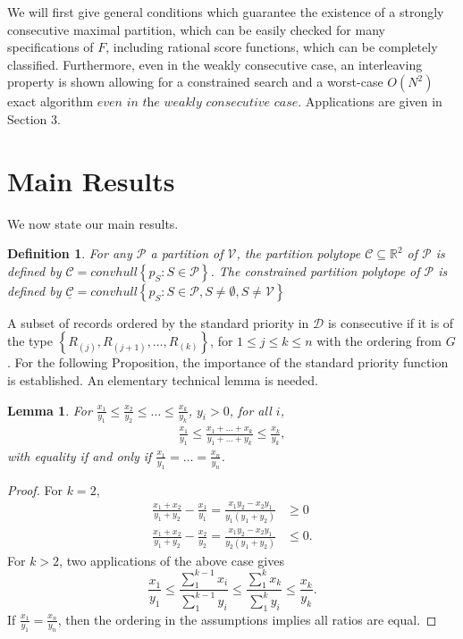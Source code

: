 \documentclass{article}
\newtheorem{definition}{Definition}
\newtheorem{lemma}{Lemma}
\theoremstyle{case}
\begin{document}
\vspace{4pt}

We will first give general conditions which guarantee the existence of a strongly consecutive maximal partition, which can be easily checked for many specifications of $F$, including rational score functions, which can be completely classified. Furthermore, even in the weakly consecutive case, an interleaving property is shown allowing for a constrained search and a worst-case $O(N^2)$ exact algorithm $\textit{even in the weakly consecutive case}$. Applications are given in Section 3.

\section{Main Results}
We now state our main results. 

\begin{definition}
For any $\mathcal{P}$ a partition of $\mathcal{V}$, the partition polytope $\mathcal{C} \subseteq \mathbb{R}^2$ of $\mathcal{P}$ is defined by $\mathcal{C} = convhull \left\lbrace p_S : S \in \mathcal{P}\right\rbrace$. The constrained partition polytope of $\mathcal{P}$ is defined by $\underline{\mathcal{C}} = convhull \left\lbrace p_S : S \in \mathcal{P}, S \neq \emptyset , S \neq \mathcal{V}\right\rbrace$
\end{definition}

A subset of records ordered by the standard priority in $\mathcal{D}$ is consecutive if it is of the type $\left\lbrace R_{(j)}, R_{(j+1)}, \dots, R_{(k)}\right\rbrace$, for $1 \leq j \leq k \leq n$ with the ordering from $G$. For the following Proposition, the importance of the standard priority function is established. An elementary technical lemma is needed.

\begin{lemma}
For $\frac{x_1}{y_1} \leq \frac{x_2}{y_2} \leq \dots \leq \frac{x_k}{y_k}$, $y_i > 0$, for all $i$,
\begin{align*}
\frac{x_1}{y_1} \leq \frac{x_1 + \dots + x_k}{y_1 + \dots + y_k} \leq \frac{x_k}{y_k},
\end{align*}
with equality if and only if $\frac{x_1}{y_1} = \dots = \frac{x_n}{y_n}$.
\end{lemma}
\begin{proof}
For $k=2$,
\begin{align*}
\frac{x_1+x_2}{y_1+y_2} - \frac{x_1}{y_1} = \frac{x_1y_2 - x_2y_1}{y_1\left( y_1 + y_2\right)} &\geq 0 \\
\frac{x_1 + x_2}{y_1 + y_2} - \frac{x_2}{y_2} = \frac{x_1y_2 - x_2y_1}{y_2\left( y_1 + y_2\right)} &\leq 0.
\end{align*}
For $k > 2$, two applications of the above case gives
\[
\frac{x_1}{y_1} \leq \frac{\sum_1^{k-1} x_i}{\sum_1^{k-1} y_i} \leq \frac{\sum_1^k x_k}{\sum_1^k y_i} \leq \frac{x_k}{y_k}. 
\]
If $\frac{x_1}{y_1} = \frac{x_n}{y_n}$, then the ordering in the assumptions implies all ratios are equal. 
\end{proof}
\end{document}

